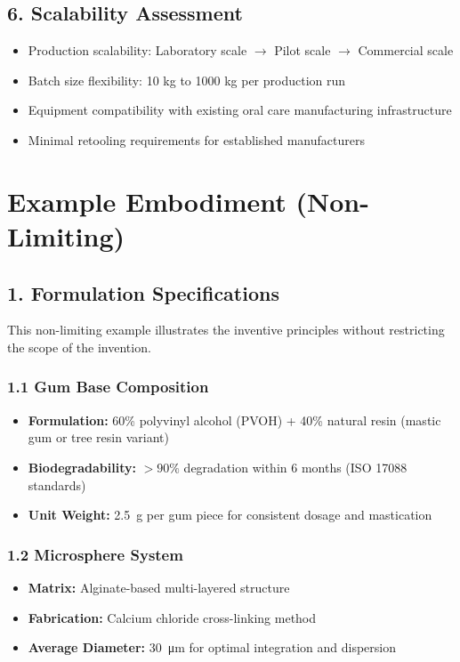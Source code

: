 \documentclass[12pt]{article}
\begin{document}
\subsection*{6. Scalability Assessment}
\begin{itemize}
    \item Production scalability: Laboratory scale $\rightarrow$ Pilot scale $\rightarrow$ Commercial scale
    \item Batch size flexibility: 10 kg to 1000 kg per production run
    \item Equipment compatibility with existing oral care manufacturing infrastructure
    \item Minimal retooling requirements for established manufacturers
\end{itemize}

\section*{Example Embodiment (Non-Limiting)}

\subsection*{1. Formulation Specifications}
This non-limiting example illustrates the inventive principles without restricting the scope of the invention.

\subsubsection*{1.1 Gum Base Composition}
\begin{itemize}
    \item \textbf{Formulation:} 60\% polyvinyl alcohol (PVOH) + 40\% natural resin (mastic gum or tree resin variant)
    \item \textbf{Biodegradability:} $>90\%$ degradation within 6 months (ISO 17088 standards)
    \item \textbf{Unit Weight:} \SI{2.5}{\gram} per gum piece for consistent dosage and mastication
\end{itemize}

\subsubsection*{1.2 Microsphere System}
\begin{itemize}
    \item \textbf{Matrix:} Alginate-based multi-layered structure
    \item \textbf{Fabrication:} Calcium chloride cross-linking method
    \item \textbf{Average Diameter:} \SI{30}{\micro\meter} for optimal integration and dispersion
\end{itemize}
\end{document}
